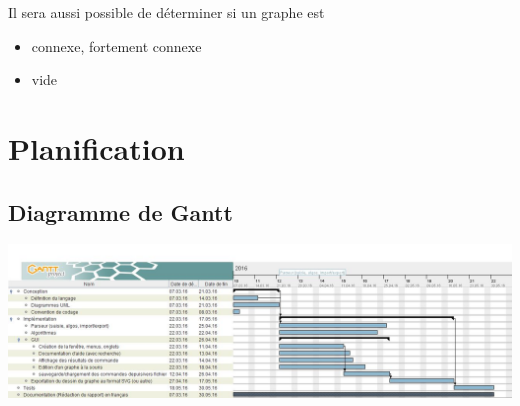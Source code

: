 \documentclass[french]{article}
\begin{document}
			Il sera aussi possible de déterminer si un graphe est
			\begin{itemize}
				\item connexe, fortement connexe
				\item vide
			\end{itemize}
		
	\section{Planification}
		\subsection{Diagramme de Gantt}
			\includegraphics[width=\textwidth]{diagram_gantt}
			
\end{document}
